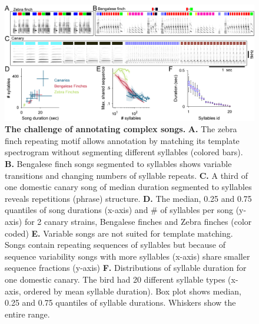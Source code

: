 \documentclass[10pt,letterpaper]{article}
\begin{document}
\begin{figure}[!ht]
\includegraphics[scale=0.725]{Figures/fig1/Figure1_v4.png}
\caption{{\bf The challenge of annotating complex songs.}
\textbf{A.} The zebra finch repeating motif allows annotation by matching its template spectrogram without segmenting different syllables (colored bars).
\textbf{B.} Bengalese finch songs segmented to syllables shows variable transitions and changing numbers of syllable repeats.
\textbf{C.} A third of one domestic canary song of median duration segmented to syllables reveals repetitions (phrase) structure.  
\textbf{D.} The median, 0.25 and 0.75 quantiles of song durations (x-axis) and # of syllables per song (y-axis) for 2 canary strains, Bengalese finches and Zebra finches (color coded)
\textbf{E.} Variable songs are not suited for template matching. Songs contain repeating sequences of syllables but because of sequence variability songs with more syllables (x-axis) share smaller sequence fractions (y-axis)
\textbf{F.} Distributions of syllable duration for one domestic canary. The bird had 20 different syllable types (x-axis, ordered by mean syllable duration). Box plot shows median, 0.25 and 0.75 quantiles of syllable durations. Whiskers show the entire range.}
\label{fig1}
\end{figure} 
\end{document}
